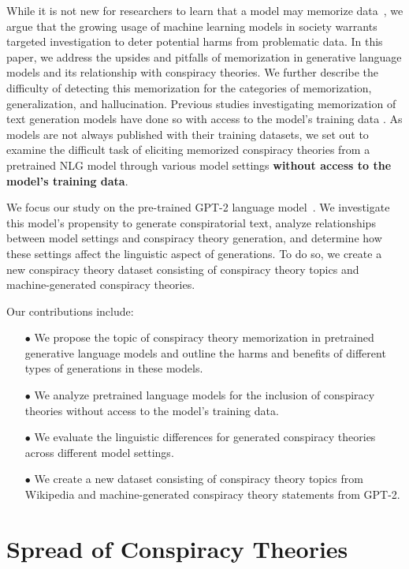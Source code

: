 \documentclass[11pt,a4paper]{article}
\begin{document}
While it is not new for researchers to learn that a model may memorize data~\cite{radhakrishnan2019memorization}, we argue that the growing usage of machine learning models in society warrants targeted investigation to deter potential harms from problematic data. In this paper, we address the upsides and pitfalls of memorization in generative language models and its relationship with conspiracy theories. We further describe the difficulty of detecting this memorization for the categories of memorization, generalization, and hallucination. Previous studies investigating memorization of text generation models have done so with access to the model's training data \cite{carlini2019secret,carlini2020extracting}. As models are not always published with their training datasets, we set out to examine the difficult task of eliciting memorized conspiracy theories from a pretrained NLG model through various model settings \textbf{without access to the model's training data}. 

 We focus our study on the pre-trained GPT-2 language model~\cite{radford2019language}. 
We investigate this model's propensity to generate conspiratorial text, analyze relationships between model settings and conspiracy theory generation, and determine how these settings affect the linguistic aspect of generations. To do so, we create a new conspiracy theory dataset consisting of conspiracy theory topics and machine-generated conspiracy theories.

Our contributions include:
\begin{itemize}
  \item[$\bullet$]  We propose the topic of conspiracy theory memorization in pretrained generative language models and outline the harms and benefits of different types of generations in these models. 
  \item[$\bullet$] We analyze pretrained language models for the inclusion of conspiracy theories without access to the model's training data.
  \item[$\bullet$] We evaluate the linguistic differences for generated conspiracy theories across different model settings.
  \item[$\bullet$] We create a new dataset consisting of conspiracy theory topics from Wikipedia and machine-generated conspiracy theory statements from GPT-2.
\end{itemize}

\section{Spread of Conspiracy Theories}
\end{document}
